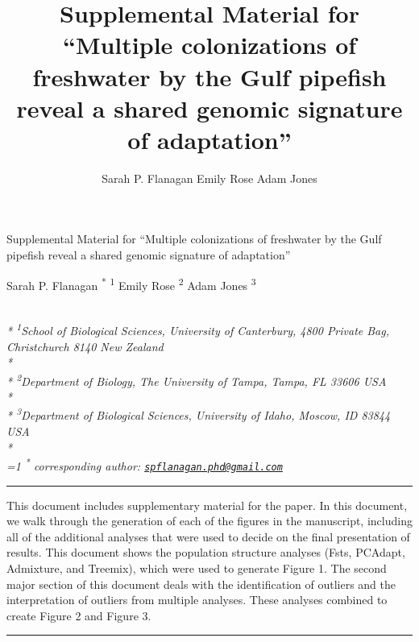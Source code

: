 \documentclass[11pt,]{article}
\title{Supplemental Material for ``Multiple colonizations of freshwater by the
Gulf pipefish reveal a shared genomic signature of adaptation''}
\author{
Sarah P. Flanagan
Emily Rose
Adam Jones
}
\date{}
\renewenvironment{abstract}{
  \hfill\begin{minipage}{1\textwidth}
  \rule{\textwidth}{1pt}\vspace{5pt}
  \normalsize
  \begin{justify}
  \bfseries\abstractname\vspace{5pt}
  \end{justify}}
  {\par\noindent\rule{\textwidth}{1pt}\end{minipage}
}
\begin{document}
\begin{singlespace}
\begin{center}
\huge Supplemental Material for ``Multiple colonizations of freshwater by the
Gulf pipefish reveal a shared genomic signature of adaptation''
\end{center}
\begin{center}
\large
Sarah P. Flanagan \textsuperscript{*} \textsuperscript{1} 
Emily Rose \textsuperscript{2} 
Adam Jones \textsuperscript{3} 
\end{center}
\begin{justify}
\footnotesize \emph{ 
\\*
\textsuperscript{1}School of Biological Sciences, University of Canterbury, 4800 Private
Bag, Christchurch 8140 New Zealand\\*
\\*
\textsuperscript{2}Department of Biology, The University of Tampa, Tampa, FL 33606 USA\\*
\\*
\textsuperscript{3}Department of Biological Sciences, University of Idaho, Moscow, ID 83844
USA\\*
}
\setcounter{num}{1}
\\[0.1cm]
\footnotesize \emph{ 
\ifnum\value{num}=1%
\textsuperscript{*} corresponding author:
\fi
\href{mailto:spflanagan.phd@gmail.com}{\nolinkurl{spflanagan.phd@gmail.com}}
}
\end{justify}
\normalsize

\begin{abstract}
This document includes supplementary material for the paper. In this
document, we walk through the generation of each of the figures in the
manuscript, including all of the additional analyses that were used to
decide on the final presentation of results. This document shows the
population structure analyses (Fsts, PCAdapt, Admixture, and Treemix),
which were used to generate Figure 1. The second major section of this
document deals with the identification of outliers and the
interpretation of outliers from multiple analyses. These analyses
combined to create Figure 2 and Figure 3.
\end{abstract}
\end{singlespace}

{
\hypersetup{linkcolor=black}
\setcounter{tocdepth}{2}
\tableofcontents
}
\end{document}
